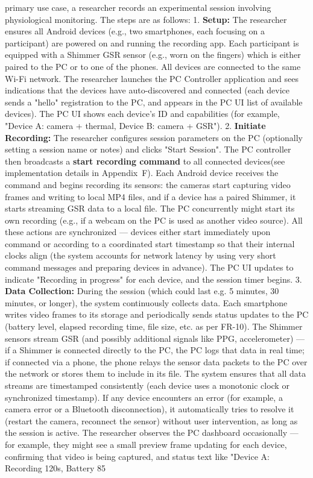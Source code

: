 primary use case, a researcher records an experimental session involving physiological monitoring. The steps are as follows: 1. \textbf{Setup:} The researcher ensures all Android devices (e.g., two smartphones, each focusing on a participant) are powered on and running the recording app. Each participant is equipped with a Shimmer GSR sensor (e.g., worn on the fingers) which is either paired to the PC or to one of the phones. All devices are connected to the same Wi-Fi network. The researcher launches the PC Controller application and sees indications that the devices have auto-discovered and connected (each device sends a "hello" registration to the PC, and appears in the PC UI list of available devices). The PC UI shows each device's ID and capabilities (for example, "Device A: camera + thermal, Device B: camera + GSR"). 2. \textbf{Initiate Recording:} The researcher configures session parameters on the PC (optionally setting a session name or notes) and clicks "Start Session". The PC controller then broadcasts a \textbf{start recording command} to all connected devices(see implementation details in Appendix~F). Each Android device receives the command and begins recording its sensors: the cameras start capturing video frames and writing to local MP4 files, and if a device has a paired Shimmer, it starts streaming GSR data to a local file. The PC concurrently might start its own recording (e.g., if a webcam on the PC is used as another video source). All these actions are synchronized --- devices either start immediately upon command or according to a coordinated start timestamp so that their internal clocks align (the system accounts for network latency by using very short command messages and preparing devices in advance). The PC UI updates to indicate "Recording in progress" for each device, and the session timer begins. 3. \textbf{Data Collection:} During the session (which could last e.g. 5 minutes, 30 minutes, or longer), the system continuously collects data. Each smartphone writes video frames to its storage and periodically sends status updates to the PC (battery level, elapsed recording time, file size, etc. as per FR-10). The Shimmer sensors stream GSR (and possibly additional signals like PPG, accelerometer) --- if a Shimmer is connected directly to the PC, the PC logs that data in real time; if connected via a phone, the phone relays the sensor data packets to the PC over the network or stores them to include in its file. The system ensures that all data streams are timestamped consistently (each device uses a monotonic clock or synchronized timestamp). If any device encounters an error (for example, a camera error or a Bluetooth disconnection), it automatically tries to resolve it (restart the camera, reconnect the sensor) without user intervention, as long as the session is active. The researcher observes the PC dashboard occasionally --- for example, they might see a small preview frame updating for each device, confirming that video is being captured, and status text like "Device A: Recording 120s, Battery 85%
